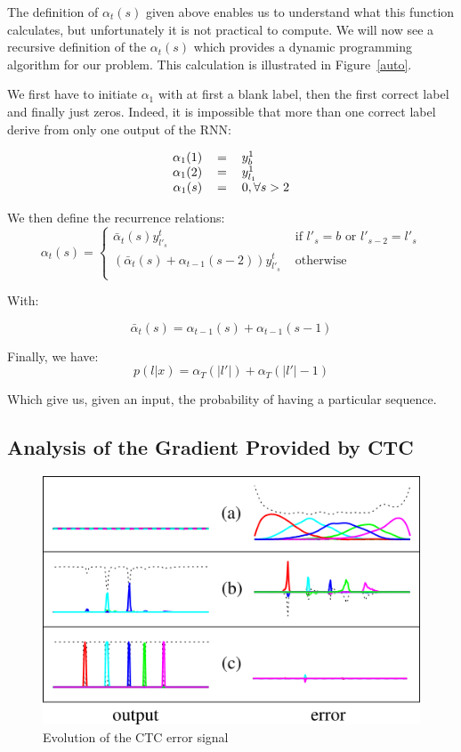 \documentclass[11pt,a4paper]{article}
\begin{document}
The definition of $\alpha_t(s)$ given above enables us to understand what this function calculates, but unfortunately it is not practical to compute. We will now see a recursive definition of the $\alpha_t(s)$ which provides a dynamic programming algorithm for our problem. This calculation is illustrated in Figure~\ref{auto}.

We first have to initiate $\alpha_1$ with at first a blank label, then the first correct label and finally just zeros. Indeed, it is impossible that more than one correct label derive from only one output of the RNN:

\[
\begin{tabular}{rcl}
    $\alpha_1(1)$ &=& $y_b^1$\\
    $\alpha_1(2)$ &=& $y_{l_1}^1$\\
    $\alpha_1(s)$ &=& $0, \forall s > 2$
\end{tabular}
\]

We then define the recurrence relations:
\[
\alpha_t(s) = 
\begin{cases}
    \bar{\alpha}_t(s) y_{l'_s}^t & \mbox{ if } l'_s = b\mbox{ or }l'_{s-2}=l'_s \\
    (\bar{\alpha}_t(s)+\alpha_{t-1}(s-2)) y_{l'_s}^t &\mbox{ otherwise}\\
\end{cases}
\]

With:

\[
\bar{\alpha}_t(s) = \alpha_{t-1}(s) + \alpha_{t-1}(s-1)
\]

Finally, we have:
\[
    p(l|x) = \alpha_T(|l'|) + \alpha_T(|l'|-1)
\]

Which give us, given an input, the probability of having a particular sequence.


\subsection{Analysis of the Gradient Provided by CTC}

\begin{figure}[h]
    \centering
    \includegraphics[width=0.6\linewidth]{azerty2.png}
    \caption{Evolution of the CTC error signal}
    \label{error}
\end{figure}
\end{document}
